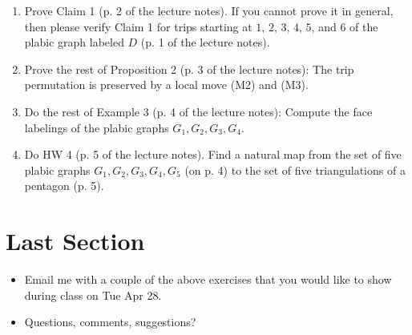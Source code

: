 \documentclass[12pt]{amsart}
\begin{document}
\begin{enumerate}[1.)]
	
\item 
Prove Claim 1 (p. 2 of the lecture notes). If you cannot prove it in general, then please verify Claim 1 for trips starting at $1$, $2$, $3$, $4$, $5$, and $6$ of the plabic graph labeled $D$ (p. 1 of the lecture notes).

\bigskip
	
\item 
Prove the rest of Proposition 2 (p. 3 of the lecture notes): The trip permutation is preserved by a local move (M2) and (M3).

\bigskip
	
\item 
Do the rest of Example 3 (p. 4 of the lecture notes): Compute the face labelings of the plabic graphs $G_1, G_2, G_3, G_4$. 

\bigskip

\item 
Do HW 4 (p. 5 of the lecture notes). Find a natural map from the set of five plabic graphs $G_1, G_2, G_3, G_4, G_5$ (on p. 4) to the set of five triangulations of a pentagon (p. 5).

\end{enumerate}



\section*{Last Section}
\begin{itemize}
	\item 
	Email me with a couple of the above exercises that you would like to show during class on Tue Apr 28.
	\item
	Questions, comments, suggestions?
\end{itemize}
\end{document}
